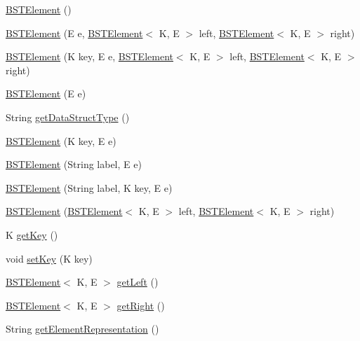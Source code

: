 \begin{DoxyCompactItemize}
\item 
\mbox{\hyperlink{classbridges_1_1base_1_1_b_s_t_element_a5a557bf3e29e2936c244147c69e04795}{B\+S\+T\+Element}} ()
\item 
\mbox{\hyperlink{classbridges_1_1base_1_1_b_s_t_element_a0ec94ad6e2313ada05b48eb83a2f31cb}{B\+S\+T\+Element}} (E e, \mbox{\hyperlink{classbridges_1_1base_1_1_b_s_t_element}{B\+S\+T\+Element}}$<$ K, E $>$ left, \mbox{\hyperlink{classbridges_1_1base_1_1_b_s_t_element}{B\+S\+T\+Element}}$<$ K, E $>$ right)
\item 
\mbox{\hyperlink{classbridges_1_1base_1_1_b_s_t_element_a6b5bae96b241996942c467a78e6262ea}{B\+S\+T\+Element}} (K key, E e, \mbox{\hyperlink{classbridges_1_1base_1_1_b_s_t_element}{B\+S\+T\+Element}}$<$ K, E $>$ left, \mbox{\hyperlink{classbridges_1_1base_1_1_b_s_t_element}{B\+S\+T\+Element}}$<$ K, E $>$ right)
\item 
\mbox{\hyperlink{classbridges_1_1base_1_1_b_s_t_element_aa40760e586322a406841765bcf2aafc6}{B\+S\+T\+Element}} (E e)
\item 
String \mbox{\hyperlink{classbridges_1_1base_1_1_b_s_t_element_ae51e96c80d61e1a6c74f6d56a4bc2fef}{get\+Data\+Struct\+Type}} ()
\item 
\mbox{\hyperlink{classbridges_1_1base_1_1_b_s_t_element_ae19a9a445ae112673edf57a24dcf38e9}{B\+S\+T\+Element}} (K key, E e)
\item 
\mbox{\hyperlink{classbridges_1_1base_1_1_b_s_t_element_ab4a92ca5d5bdd5966bd63def8e867173}{B\+S\+T\+Element}} (String label, E e)
\item 
\mbox{\hyperlink{classbridges_1_1base_1_1_b_s_t_element_a6b76778c0c1486f599b90e51cf0a477c}{B\+S\+T\+Element}} (String label, K key, E e)
\item 
\mbox{\hyperlink{classbridges_1_1base_1_1_b_s_t_element_a067f0fcc18228e8c9427deadba9f4d96}{B\+S\+T\+Element}} (\mbox{\hyperlink{classbridges_1_1base_1_1_b_s_t_element}{B\+S\+T\+Element}}$<$ K, E $>$ left, \mbox{\hyperlink{classbridges_1_1base_1_1_b_s_t_element}{B\+S\+T\+Element}}$<$ K, E $>$ right)
\item 
K \mbox{\hyperlink{classbridges_1_1base_1_1_b_s_t_element_afba950fad36d3327b01003df3ba4cc9f}{get\+Key}} ()
\item 
void \mbox{\hyperlink{classbridges_1_1base_1_1_b_s_t_element_a51990b684df6998dc25b324dc7631ab4}{set\+Key}} (K key)
\item 
\mbox{\hyperlink{classbridges_1_1base_1_1_b_s_t_element}{B\+S\+T\+Element}}$<$ K, E $>$ \mbox{\hyperlink{classbridges_1_1base_1_1_b_s_t_element_a8abdd6e4a0486de7fa45fbb233b56688}{get\+Left}} ()
\item 
\mbox{\hyperlink{classbridges_1_1base_1_1_b_s_t_element}{B\+S\+T\+Element}}$<$ K, E $>$ \mbox{\hyperlink{classbridges_1_1base_1_1_b_s_t_element_ae7ed1b98f48acfcfc0a3a5bf6219ce00}{get\+Right}} ()
\item 
String \mbox{\hyperlink{classbridges_1_1base_1_1_b_s_t_element_a0619c81bb38df6fc64a651a909f64d84}{get\+Element\+Representation}} ()
\end{DoxyCompactItemize}
